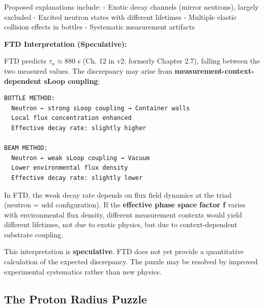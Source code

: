 \documentclass[
  11pt,
  letterpaper,
  twoside,
  openany]{book}
\makeatletter
\let\orig@subsection\subsection
\renewcommand{\subsection}{\needspace{6\baselineskip}\orig@subsection}
\makeatother
\begin{document}
Proposed explanations include: - Exotic decay channels (mirror
neutrons), largely excluded - Excited neutron states with different
lifetimes - Multiple elastic collision effects in bottles - Systematic
measurement artifacts

\textbf{FTD Interpretation (Speculative):}

FTD predicts \(\tau_n \approx 880\) s (Ch. 12 in v2; formerly Chapter
2.7), falling between the two measured values. The discrepancy may arise
from \textbf{measurement-context-dependent sLoop coupling}:

\begin{verbatim}
BOTTLE METHOD:
  Neutron ← strong sLoop coupling → Container walls
  Local flux concentration enhanced
  Effective decay rate: slightly higher

BEAM METHOD:
  Neutron ← weak sLoop coupling → Vacuum
  Lower environmental flux density
  Effective decay rate: slightly lower
\end{verbatim}

In FTD, the weak decay rate depends on flux field dynamics at the triad
(neutron = udd configuration). If the \textbf{effective phase space
factor f} varies with environmental flux density, different measurement
contexts would yield different lifetimes, not due to exotic physics, but
due to context-dependent substrate coupling.

\begin{tcolorbox}[enhanced jigsaw, colbacktitle=quarto-callout-warning-color!10!white, titlerule=0mm, bottomtitle=1mm, bottomrule=.15mm, colback=white, arc=.35mm, breakable, toprule=.15mm, title=\textcolor{quarto-callout-warning-color}{\faExclamationTriangle}\hspace{0.5em}{Epistemic Status}, rightrule=.15mm, coltitle=black, leftrule=.75mm, colframe=quarto-callout-warning-color-frame, toptitle=1mm, opacityback=0, opacitybacktitle=0.6, left=2mm]

This interpretation is \textbf{speculative}. FTD does not yet provide a
quantitative calculation of the expected discrepancy. The puzzle may be
resolved by improved experimental systematics rather than new physics.

\end{tcolorbox}

\subsection{The Proton Radius Puzzle}\label{sec-proton-radius}
\end{document}
